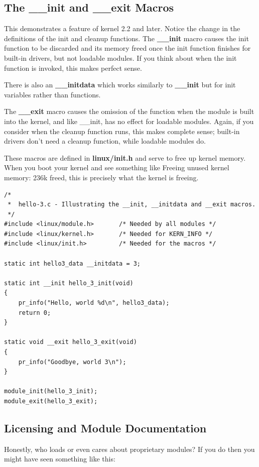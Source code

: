 \documentclass[11pt]{article}
\begin{document}
\subsection*{The \_\_init and \_\_exit Macros}
\label{sec-4-3}
This demonstrates a feature of kernel 2.2 and later. Notice the change in the definitions of the init and cleanup functions. The \textbf{\_\_init} macro causes the init function to be discarded and its memory freed once the init function finishes for built-in drivers, but not loadable modules. If you think about when the init function is invoked, this makes perfect sense.

There is also an \textbf{\_\_initdata} which works similarly to \textbf{\_\_init} but for init variables rather than functions.

The \textbf{\_\_exit} macro causes the omission of the function when the module is built into the kernel, and like \_\_init, has no effect for loadable modules. Again, if you consider when the cleanup function runs, this makes complete sense; built-in drivers don't need a cleanup function, while loadable modules do.

These macros are defined in \textbf{linux/init.h} and serve to free up kernel memory. When you boot your kernel and see something like Freeing unused kernel memory: 236k freed, this is precisely what the kernel is freeing.

\begin{verbatim}
/*
 *  hello-3.c - Illustrating the __init, __initdata and __exit macros.
 */
#include <linux/module.h>       /* Needed by all modules */
#include <linux/kernel.h>       /* Needed for KERN_INFO */
#include <linux/init.h>         /* Needed for the macros */

static int hello3_data __initdata = 3;

static int __init hello_3_init(void)
{
    pr_info("Hello, world %d\n", hello3_data);
    return 0;
}

static void __exit hello_3_exit(void)
{
    pr_info("Goodbye, world 3\n");
}

module_init(hello_3_init);
module_exit(hello_3_exit);
\end{verbatim}

\subsection*{Licensing and Module Documentation}
\label{sec-4-4}
Honestly, who loads or even cares about proprietary modules? If you do then you might have seen something like this:
\end{document}
